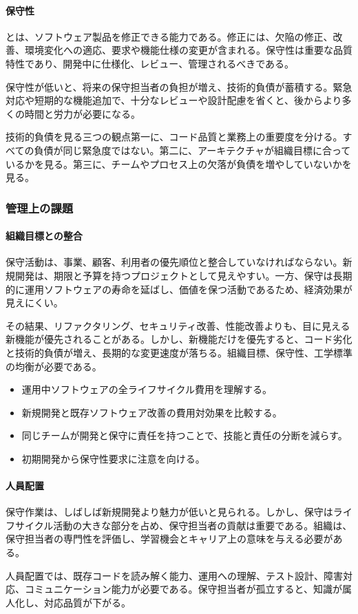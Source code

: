 \documentclass[a4paper,11pt]{ltjsarticle}
\numberwithin{figure}{section}
\numberwithin{table}{section}
\begin{document}
\paragraph{保守性}
とは、ソフトウェア製品を修正できる能力である。修正には、欠陥の修正、改善、環境変化への適応、要求や機能仕様の変更が含まれる。保守性は重要な品質特性であり、開発中に仕様化、レビュー、管理されるべきである。\par
保守性が低いと、将来の保守担当者の負担が増え、技術的負債が蓄積する。緊急対応や短期的な機能追加で、十分なレビューや設計配慮を省くと、後からより多くの時間と労力が必要になる。\par
\begin{pointbox}{技術的負債を見る三つの観点}第一に、コード品質と業務上の重要度を分ける。すべての負債が同じ緊急度ではない。第二に、アーキテクチャが組織目標に合っているかを見る。第三に、チームやプロセス上の欠落が負債を増やしていないかを見る。\end{pointbox}
\subsubsection{管理上の課題}
\paragraph{組織目標との整合}
保守活動は、事業、顧客、利用者の優先順位と整合していなければならない。新規開発は、期限と予算を持つプロジェクトとして見えやすい。一方、保守は長期的に運用ソフトウェアの寿命を延ばし、価値を保つ活動であるため、経済効果が見えにくい。\par
その結果、リファクタリング、セキュリティ改善、性能改善よりも、目に見える新機能が優先されることがある。しかし、新機能だけを優先すると、コード劣化と技術的負債が増え、長期的な変更速度が落ちる。組織目標、保守性、工学標準の均衡が必要である。\par
\begin{itemize}
\item 運用中ソフトウェアの全ライフサイクル費用を理解する。
\item 新規開発と既存ソフトウェア改善の費用対効果を比較する。
\item 同じチームが開発と保守に責任を持つことで、技能と責任の分断を減らす。
\item 初期開発から保守性要求に注意を向ける。
\end{itemize}
\paragraph{人員配置}
保守作業は、しばしば新規開発より魅力が低いと見られる。しかし、保守はライフサイクル活動の大きな部分を占め、保守担当者の貢献は重要である。組織は、保守担当者の専門性を評価し、学習機会とキャリア上の意味を与える必要がある。\par
人員配置では、既存コードを読み解く能力、運用への理解、テスト設計、障害対応、コミュニケーション能力が必要である。保守担当者が孤立すると、知識が属人化し、対応品質が下がる。\par
\end{document}
